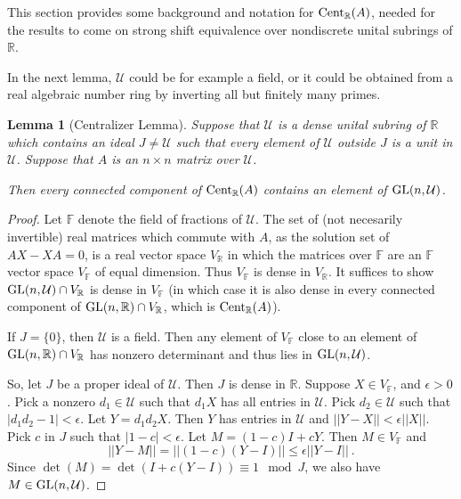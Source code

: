 \documentclass{amsart}
\newtheorem{lemma}[theorem]{Lemma}
\theoremstyle{definition}
\theoremstyle{remark}
\numberwithin{equation}{section}
\begin{document}
{{This section provides some background and notation 
for ${\textnormal{Cent}_{\mathbb R}(A)}$, needed for the results to come on 
strong shift equivalence over nondiscrete unital subrings of $\mathbb R$. 

In the next lemma,  $\mathcal U$ could be for example a field, or it 
could be obtained 
from a real algebraic number ring by inverting all but finitely
many primes.

\begin{lemma}[Centralizer Lemma]\label{centralizerlemma}
 Suppose that $\mathcal U$ is a dense unital subring of 
$\mathbb R$ which contains an ideal $J\neq \mathcal U$ 
such that every  element of $\mathcal U$ outside $J$ is a 
unit in $\mathcal U$.  Suppose that $A $ is an $n\times n$
 matrix over $\mathcal U$. 

Then every connected component of $\textnormal{Cent}_{\mathbb R}(A)$ 
contains an element of $\textnormal{GL}(n,\mathcal U)$. 
\end{lemma} 

\begin{proof} 
Let $\mathbb F$ denote the field of fractions of $\mathcal U$. 
The set of (not necesarily invertible) 
real matrices which commute with $A$, as the solution 
set of $AX-XA=0$, is a real vector space $V_{\mathbb R}$ in 
which the matrices over $\mathbb F$ are an $\mathbb F$ 
vector space $V_{\mathbb F}$ of equal dimension.
Thus  $V_{\mathbb F}$  is dense in 
$V_{\mathbb R}$. 
It suffices to show $\textnormal{GL}(n,\mathcal U) \cap V_{\mathbb R}$ 
is dense in $ V_{\mathbb F}$ (in which case   
it is 
also dense in every connected component of 
$\textnormal{GL}(n,\mathbb R) \cap V_{\mathbb R}$, which is  
$\textnormal{Cent}_{\mathbb R}(A)$).  

If $J=\{0\}$, then $\mathcal U$ is a field. 
Then any element of 
$V_{\mathbb F}$ close to an element of 
$\textnormal{GL}(n,\mathbb R) \cap V_{\mathbb R}$ has  nonzero 
determinant and thus lies in 
$\textnormal{GL}(n,\mathcal U)$. 

So, let $J$ be a proper ideal 
of $\mathcal U$. Then $J$ is dense in $\mathbb R$. 
Suppose  $X\in V_{\mathbb F}$, 
and $\epsilon >0$.  Pick a nonzero $d_1\in \mathcal U$ 
such that $d_1X$ has all entries in $\mathcal U$. 
Pick $d_2\in \mathcal U$ such that $|d_1d_2-1|< \epsilon$. Let 
$Y=d_1d_2X$. Then $Y$ has entries in $\mathcal U$ and 
$||Y-X||< \epsilon ||X||$. 
Pick $c$ in $J$ such that $|1-c|<\epsilon$. 
Let $M= (1-c)I +cY$. Then $M\in V_{\mathbb F}$ and 
\[
||Y-M||
= ||(1-c)(Y-I) || \leq \epsilon ||Y-I||\ . 
\] 
Since  $\det(M)= \det(I+c(Y-I))
 \equiv 1 \mod J$, we also have 
$M\in \textnormal{GL}(n,\mathcal U)$. 
\end{proof} 

}}
\end{document}
